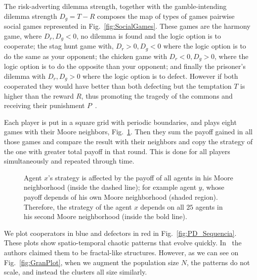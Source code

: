 The risk-adverting dilemma strength, together with the gamble-intending dilemma strength $D_g = T - R$ composes the map of types of games pairwise social games represented in Fig.~\ref{fig:SocialGames}. These games are the harmony game, where $D_r,D_g < 0$, no dilemma is found and the logic option is to cooperate; the stag hunt game with, $D_r > 0, D_g < 0$ where the logic option is to do the same as your opponent; the chicken game with $D_r < 0, D_g > 0$, where the logic option is to do the opposite than your opponent; and finally the prisoner's dilemma with $D_r,D_g > 0$ where the logic option is to defect. However if both cooperated they would have better than both defecting but the temptation $T$ is higher than the reward $R$, thus promoting the tragedy of the commons and receiving their punishment $P$~\cite{TragedyCommons}.

Each player is put in a square grid with periodic boundaries, and plays eight games with their Moore neighbors, Fig.~\ref{fig:Moore2Neigh}. Then they sum the payoff gained in all those games and compare the result with their neighbors and copy the strategy of the one with greater total payoff in that round. This is done for all players simultaneously and repeated through time. 


\begin{figure}
\centering
{}
\caption{Agent $x$'s strategy is affected by the payoff of all agents in his Moore neighborhood (inside the dashed line); for example agent $y$, whose payoff depends of his own Moore neighborhood (shaded region). Therefore, the strategy of the agent $x$ depends on all $25$ agents in his second Moore neighborhood (inside the bold line).}
\label{fig:Moore2Neigh}
\end{figure}





We plot cooperators in blue and defectors in red in Fig.~\ref{fig:PD_Sequencia}. These plots show spatio-temporal chaotic patterns that evolve quickly. In~\cite{SpatialChaos} the authors claimed them to be fractal-like structures. However, as we can see on Fig.~\ref{fig:GranPlot}, when we augment the population size $N$, the patterns do not scale, and instead the clusters all size similarly.





